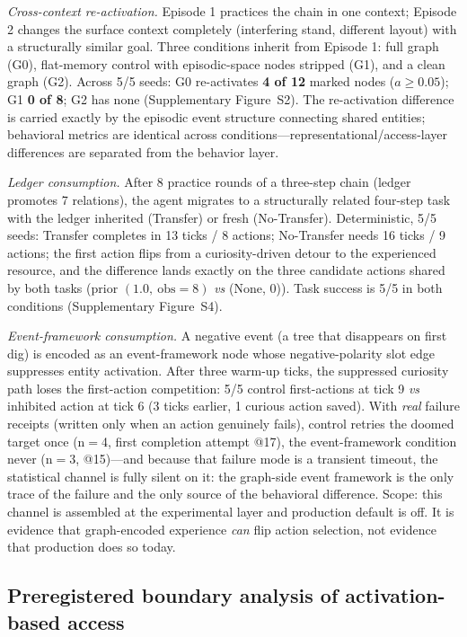 \documentclass[10pt,a4paper]{article}
\begin{document}
\emph{Cross-context re-activation.} Episode 1 practices the chain in one context; Episode 2 changes the surface context completely (interfering stand, different layout) with a structurally similar goal. Three conditions inherit from Episode 1: full graph (G0), flat-memory control with episodic-space nodes stripped (G1), and a clean graph (G2). Across 5/5 seeds: G0 re-activates \textbf{4 of 12} marked nodes ($a\ge0.05$); G1 \textbf{0 of 8}; G2 has none (Supplementary Figure~S2). The re-activation difference is carried exactly by the episodic event structure connecting shared entities; behavioral metrics are identical across conditions---representational/access-layer differences are separated from the behavior layer.

\emph{Ledger consumption.} After 8 practice rounds of a three-step chain (ledger promotes 7 relations), the agent migrates to a structurally related four-step task with the ledger inherited (Transfer) or fresh (No-Transfer). Deterministic, 5/5 seeds: Transfer completes in 13 ticks / 8 actions; No-Transfer needs 16 ticks / 9 actions; the first action flips from a curiosity-driven detour to the experienced resource, and the difference lands exactly on the three candidate actions shared by both tasks (prior $(1.0,\ \text{obs}{=}8)$ \emph{vs} (None, 0)). Task success is 5/5 in both conditions (Supplementary Figure~S4).

\emph{Event-framework consumption.} A negative event (a tree that disappears on first dig) is encoded as an event-framework node whose negative-polarity slot edge suppresses entity activation. After three warm-up ticks, the suppressed curiosity path loses the first-action competition: 5/5 control first-actions at tick 9 \emph{vs} inhibited action at tick 6 (3 ticks earlier, 1 curious action saved). With \emph{real} failure receipts (written only when an action genuinely fails), control retries the doomed target once (n$=$4, first completion attempt @17), the event-framework condition never (n$=$3, @15)---and because that failure mode is a transient timeout, the statistical channel is fully silent on it: the graph-side event framework is the only trace of the failure and the only source of the behavioral difference. Scope: this channel is assembled at the experimental layer and production default is off. It is evidence that graph-encoded experience \emph{can} flip action selection, not evidence that production does so today.

\subsection{Preregistered boundary analysis of activation-based access}
\label{sec:res-boundary}
\end{document}
